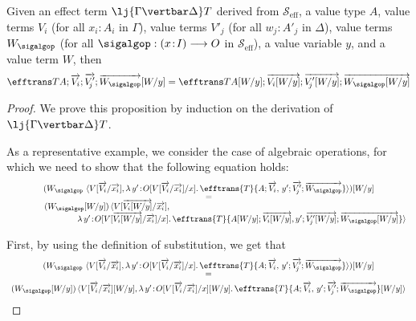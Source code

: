 \begin{proposition}
\label{prop:effecttermstranslationsubstitution}
Given an effect term $\lj {\Gamma \vertbar \Delta} T$ derived from $\mathcal{S}_{\text{eff}}$, a value type $A$, value terms $V_{i}$ (for all $x_i \!:\! A_i$ in $\Gamma$), value terms $V'_{\!j}$ (for all $w_{\!j} \!:\! A'_{\!j}$ in $\Delta$), value terms $W_{\sigalgop}$ (for all $\sigalgop : (x \!:\! I) \longrightarrow O$ in $\mathcal{S}_{\text{eff}}$), a value variable $y$, and a value term $W$, then 
\[
\efftrans T {A; \overrightarrow{V_i}; \overrightarrow{V'_{\!j}}; \overrightarrow{W_{\sigalgop}}}[W/y] = \efftrans T {A[W/y]; \overrightarrow{V_i[W/y]}; \overrightarrow{V'_{\!j}[W/y]}; \overrightarrow{W_{\sigalgop}[W/y]}}
\]
\end{proposition}

\begin{proof}
We prove this proposition by induction on the derivation of $\lj {\Gamma \vertbar \Delta} T$. 

As a representative example, we consider the case of algebraic operations, for which we need to show that the following equation holds:
\[
\begin{array}{c}
(W_{\sigalgop}\,\, \langle V[\overrightarrow{V_i}/\overrightarrow{x_i}] , \lambda\, y' \!:\! O[V[\overrightarrow{V_i}/\overrightarrow{x_i}]/x] .\, \efftrans {T} {A; \overrightarrow{V_i},\, y'; \overrightarrow{V'_{\!j}}; \overrightarrow{W_{\sigalgop}}}\rangle)[W/y] 
\\[-1mm]
=
\\[-1mm]
\hspace{-8.5cm}
(W_{\sigalgop}[W/y])\, \langle V[\overrightarrow{V_i[W/y]}/\overrightarrow{x_i}] , 
\\
\hspace{2.75cm}
\lambda\, y' \!:\! O[V[\overrightarrow{V_i[W/y]}/\overrightarrow{x_i}]/x] .\, \efftrans {T} {A[W/y]; \overrightarrow{V_i[W/y]}, y'; \overrightarrow{V'_{\!j}[W/y]}; \overrightarrow{W_{\sigalgop}[W/y]}}\rangle
\end{array}
\]

First, by using the definition of substitution, we get that
\[
\begin{array}{c}
(W_{\sigalgop}\,\, \langle V[\overrightarrow{V_i}/\overrightarrow{x_i}] , \lambda\, y' \!:\! O[V[\overrightarrow{V_i}/\overrightarrow{x_i}]/x] .\, \efftrans {T} {A; \overrightarrow{V_i} ,\, y'; \overrightarrow{V'_{\!j}}; \overrightarrow{W_{\sigalgop}}}\rangle)[W/y]
\\[-1mm]
=
\\[1mm]
(W_{\sigalgop}[W/y])\, \langle V[\overrightarrow{V_i}/\overrightarrow{x_i}][W/y] , \lambda\, y' \!:\! O[V[\overrightarrow{V_i}/\overrightarrow{x_i}]/x][W/y] .\, \efftrans {T} {A; \overrightarrow{V_i},\, y'; \overrightarrow{V'_{\!j}}; \overrightarrow{W_{\sigalgop}}}[W/y]\rangle
\end{array}
\]


\end{proof}
